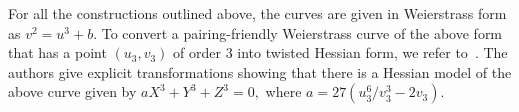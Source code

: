 


For all the constructions outlined above,
the curves are given in Weierstrass form as
$v^2 = u^3 + b.$
To convert a pairing-friendly Weierstrass curve of the above form
that has a point $(u_3,v_3)$ of order 3
into twisted Hessian form, we refer to~\cite{2015/hessian}.
The authors give explicit transformations showing that there is a Hessian model of the above curve given by
$aX^3 + Y^3 + Z^3 = 0,$
where
$a = 27(u_3^6/v_3^3-2v_3)$.
%
%
%

